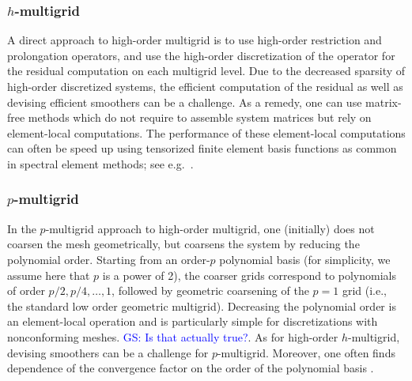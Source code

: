 \documentclass[smallcondensed,final]{svjour3}     %
\newcommand{\gsnote}[1]{\textcolor{blue}{GS: #1}}
\begin{document}
\subsubsection{$h$-multigrid}\label{subsec:h}
A direct approach to high-order multigrid is to use high-order
restriction and prolongation operators, and use the high-order
discretization of the operator for the residual computation on each
multigrid level.
Due to the decreased sparsity of high-order discretized systems, the
efficient computation of the residual as well as devising efficient
smoothers can be a challenge. As a remedy, one can use matrix-free
methods which do not require to assemble system matrices but rely on
element-local computations. The performance of these element-local
computations can often be speed up using tensorized finite element
basis functions as common in spectral element methods; see
e.g.~\cite{DevilleFischerMund02}. 

\subsubsection{$p$-multigrid}\label{subsec:p}
In the $p$-multigrid approach to high-order multigrid, one (initially)
does not coarsen the mesh geometrically, but coarsens the system by
reducing the polynomial order. Starting from an order-$p$ polynomial
basis (for simplicity, we assume here that $p$ is a power of 2), the
coarser grids correspond to polynomials of order $p/2, p/4,\ldots,1$,
followed by geometric coarsening of the $p=1$ grid (i.e., the standard
low order geometric multigrid). Decreasing the polynomial order is an
element-local operation and is particularly simple for discretizations
with nonconforming meshes. \gsnote{Is that actually true?}. As for
high-order $h$-multigrid, devising smoothers can be a challenge for
$p$-multigrid.  Moreover, one often finds dependence of the
convergence factor on the order of the polynomial basis
\cite{MadayMunoz89}.
\end{document}
